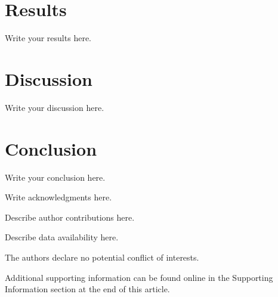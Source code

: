 \documentclass[AMA,LATO2COL]{WileyNJDv5} %
\begin{document}
\section{Results}

Write your results here.

\section{Discussion}

Write your discussion here.

\section{Conclusion}

Write your conclusion here.


Write acknowledgments here.


Describe author contributions here.


Describe data availability here.


The authors declare no potential conflict of interests.




Additional supporting information can be found online in the Supporting Information section at the end of this article.
\end{document}
